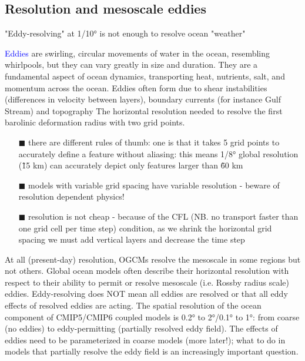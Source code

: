 \subsection{Resolution and mesoscale eddies}
\begin{centering}
	"Eddy-resolving" at 1/10° is not enough to resolve ocean "weather"
\end{centering}
\textcolor{Blue}{Eddies} are swirling, circular movements of water in the ocean, resembling whirlpools, but they can vary greatly in size and duration. They are a fundamental aspect of ocean dynamics, transporting heat, nutrients, salt, and momentum across the ocean. Eddies often form due to shear instabilities (differences in velocity between layers), boundary currents (for instance Gulf Stream) and topography
The horizontal resolution needed to resolve the first barolinic deformation radius with two grid points.
\begin{itemize}
	\item[$\blacksquare$] there are different rules of thumb: one is that it takes 5 grid points to accurately define a feature without aliasing: this means 1/8° global resolution (\~15 km) can accurately depict only features larger than \~60 km
	\item[$\blacksquare$] models with variable grid spacing have variable resolution - beware of resolution dependent physics!
	\item[$\blacksquare$] resolution is not cheap - because of the CFL (NB. no transport faster than one grid cell per time step) condition, as we shrink the horizontal grid spacing we must add vertical layers and decrease the time step
\end{itemize}
At all (present-day) resolution, OGCMs resolve the mesoscale in some regions but not others.
Global ocean models often describe their horizontal
resolution with respect to their ability to permit or
resolve mesoscale (i.e. Rossby radius scale) eddies. Eddy-resolving does NOT mean all eddies are resolved or that all eddy effects of resolved eddies are acting. The spatial resolution of the ocean component of CMIP5/CMIP6 coupled models is 0.2° to 2°/0.1° to 1°: from coarse (no eddies) to eddy-permitting (partially resolved eddy field). The effects of eddies need to be parameterized in coarse models (more later!); what to do in models that partially resolve the eddy field is an increasingly important question.

